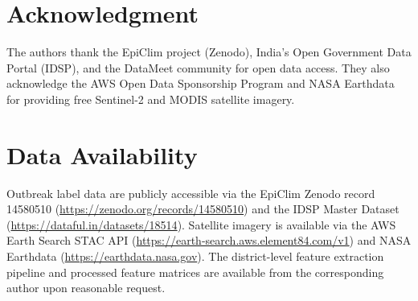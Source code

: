 \documentclass[conference]{IEEEtran}
\begin{document}
\section*{Acknowledgment}

The authors thank the EpiClim project (Zenodo), India's Open Government
Data Portal (IDSP), and the DataMeet community for open data access.
They also acknowledge the AWS Open Data Sponsorship Program and NASA
Earthdata for providing free Sentinel-2 and MODIS satellite imagery.

\section*{Data Availability}

Outbreak label data are publicly accessible via the EpiClim Zenodo record
14580510 (\url{https://zenodo.org/records/14580510}) and the IDSP Master
Dataset (\url{https://dataful.in/datasets/18514}). Satellite imagery is
available via the AWS Earth Search STAC API
(\url{https://earth-search.aws.element84.com/v1}) and NASA Earthdata
(\url{https://earthdata.nasa.gov}). The district-level feature extraction
pipeline and processed feature matrices are available from the
corresponding author upon reasonable request.



\end{document}
